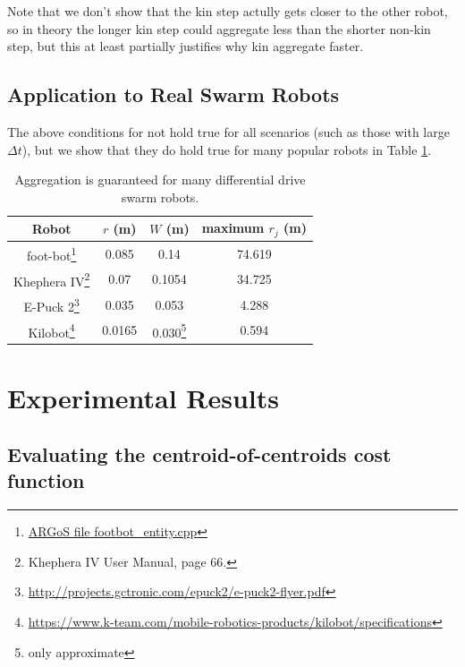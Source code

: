 \documentclass[conference]{IEEEtran}
\begin{document}
    Note that we don't show that the kin step actully gets closer to the other robot, so in theory the longer kin step could aggregate less than the shorter non-kin step, but this at least partially justifies why kin aggregate faster.

  \subsection{Application to Real Swarm Robots}

    The above conditions for not hold true for all scenarios (such as those with large $\Delta t$), but we show that they do hold true for many popular robots in Table \ref{table:robots}.

    \begin{savenotes}
    \begin{table}
      \centering
      \caption{Aggregation is guaranteed for many differential drive swarm robots.}
      \begin{tabular}{|c|c|c|c|} \hline
        Robot & $r$ (m) & $W$ (m) & maximum $r_j$ (m) \\ \hline
        foot-bot\footnote{\href{https://github.com/ilpincy/argos3/blob/master/src/plugins/robots/foot-bot/simulator/footbot_entity.cpp}{ARGoS file footbot\_entity.cpp}} &
            0.085 & 0.14 & 74.619 \\ \hline
        Khephera IV\footnote{Khephera IV User Manual, page 66.} &
            0.07 & 0.1054 & 34.725 \\ \hline
        E-Puck 2\footnote{\href{http://projects.gctronic.com/epuck2/e-puck2-flyer.pdf}{http://projects.gctronic.com/epuck2/e-puck2-flyer.pdf}} &
            0.035 & 0.053 & 4.288 \\ \hline
        Kilobot\footnote{\href{https://www.k-team.com/mobile-robotics-products/kilobot/specifications}{https://www.k-team.com/mobile-robotics-products/kilobot/specifications}} &
            0.0165 & 0.030\footnote{only approximate} & 0.594 \\ \hline
      \end{tabular}
      \label{table:robots}
    \end{table}
    \end{savenotes}

\section{Experimental Results}

  \subsection{Evaluating the centroid-of-centroids cost function} \label{section:evaluting_cost_functions}
\end{document}
